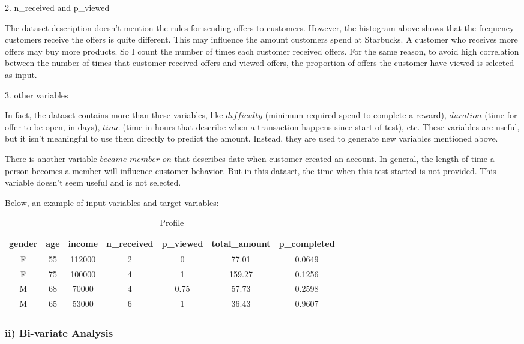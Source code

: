 \documentclass[a4paper,12pt]{article}
\begin{document}
2. n\_received and p\_viewed

The dataset description doesn't mention the rules for sending offers to customers. However, the histogram above shows that the 
frequency customers receive the offers is quite different. This may influence the amount customers spend at Starbucks. A 
customer who receives more offers may buy more products. So I count the number of times each customer received offers. For the 
same reason, to avoid high correlation between the number of times that customer received offers and viewed offers, the 
proportion of offers the customer have viewed is selected as input.

3. other variables

In fact, the dataset contains more than these variables, like $difficulty$ (minimum required spend to complete a reward), 
$duration$ (time for offer to be open, in days), $time$ (time in hours that describe when a transaction happens since start of 
test), etc. These variables are useful, but it isn't meaningful to use them directly to predict the amount. Instead, they are 
used to generate new variables mentioned above.

There is another variable $became\_member\_on$ that describes date when customer created an account. In general, the length of 
time a person becomes a member will influence customer behavior. But in this dataset, the time when this test started is not 
provided. This variable doesn't seem useful and is not selected.

Below, an example of input variables and target variables:

\begin{table}[H]
    \centering
    \begin{tabular}{|c|c|c|c|c|c|c|}
    \hline
    gender&age&income&n\_received&p\_viewed&total\_amount&p\_completed\\
    \hline
    F&55&112000&2&0&77.01&0.0649\\
    \hline
    F&75&100000&4&1&159.27&0.1256\\
    \hline
    M&68&70000&4&0.75&57.73&0.2598\\
    \hline
    M&65&53000&6&1&36.43&0.9607\\
    \hline
    \end{tabular} 
    \caption{Profile}
\end{table}

\subsubsection*{ii) Bi-variate Analysis}
\end{document}
